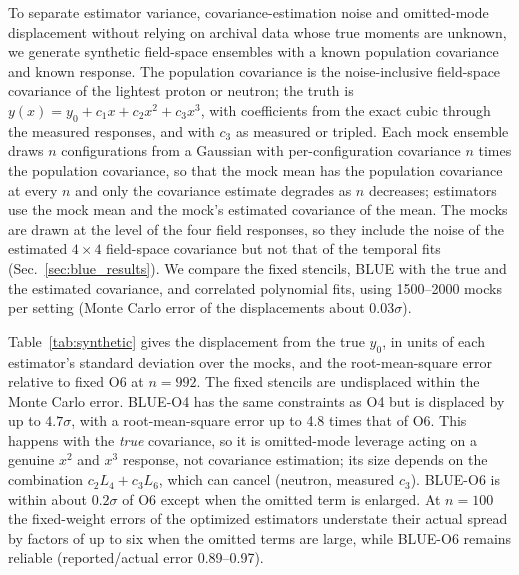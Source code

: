 \documentclass[aps,prd,reprint,twocolumn,superscriptaddress,nofootinbib,longbibliography]{revtex4-2}
\begin{document}
To separate estimator variance, covariance-estimation noise and omitted-mode displacement without relying on archival data whose true moments are unknown, we generate synthetic field-space ensembles with a known population covariance and known response. The population covariance is the noise-inclusive field-space covariance of the lightest proton or neutron; the truth is $y(x)=y_0+c_1x+c_2x^2+c_3x^3$, with coefficients from the exact cubic through the measured responses, and with $c_3$ as measured or tripled. Each mock ensemble draws $n$ configurations from a Gaussian with per-configuration covariance $n$ times the population covariance, so that the mock mean has the population covariance at every $n$ and only the covariance estimate degrades as $n$ decreases; estimators use the mock mean and the mock's estimated covariance of the mean. The mocks are drawn at the level of the four field responses, so they include the noise of the estimated $4\times4$ field-space covariance but not that of the temporal fits (Sec.~\ref{sec:blue_results}). We compare the fixed stencils, BLUE with the true and the estimated covariance, and correlated polynomial fits, using 1500--2000 mocks per setting (Monte Carlo error of the displacements about $0.03\sigma$).

Table~\ref{tab:synthetic} gives the displacement from the true $y_0$, in units of each estimator's standard deviation over the mocks, and the root-mean-square error relative to fixed O6 at $n=992$. The fixed stencils are undisplaced within the Monte Carlo error. BLUE-O4 has the same constraints as O4 but is displaced by up to $4.7\sigma$, with a root-mean-square error up to 4.8 times that of O6. This happens with the \emph{true} covariance, so it is omitted-mode leverage acting on a genuine $x^2$ and $x^3$ response, not covariance estimation; its size depends on the combination $c_2L_4+c_3L_6$, which can cancel (neutron, measured $c_3$). BLUE-O6 is within about $0.2\sigma$ of O6 except when the omitted term is enlarged. At $n=100$ the fixed-weight errors of the optimized estimators understate their actual spread by factors of up to six when the omitted terms are large, while BLUE-O6 remains reliable (reported/actual error 0.89--0.97).
\end{document}
